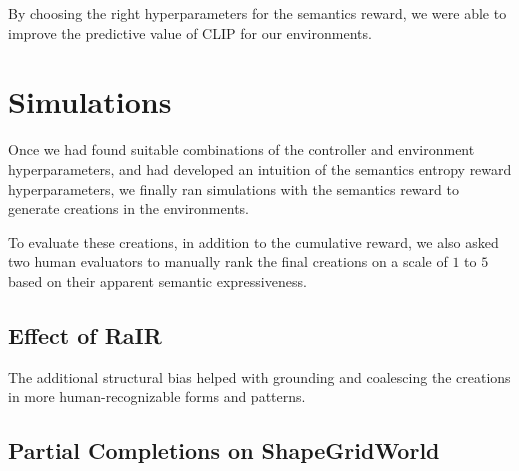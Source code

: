 
By choosing the right hyperparameters for the semantics reward, we were able to improve the predictive value of CLIP for our environments.

\newpage
\section{Simulations}
\label{sec:simulations}

Once we had found suitable combinations of the controller and environment hyperparameters, and had developed an intuition of the semantics entropy reward hyperparameters, we finally ran simulations with the semantics reward to generate creations in the environments.

To evaluate these creations, in addition to the cumulative reward, we also asked two human evaluators to manually rank the final creations on a scale of \(1\) to \(5\) based on their apparent semantic expressiveness.






\subsection{Effect of RaIR}
\label{sec:effect-rair}

The additional structural bias helped with grounding and coalescing the creations in more human-recognizable forms and patterns.


\subsection{Partial Completions on ShapeGridWorld}
\label{sec:partial-completion}

